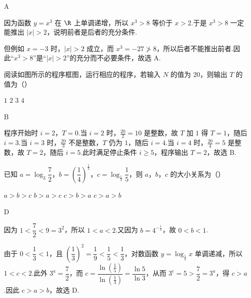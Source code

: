 \begin{answer}
A
\end{answer}

\begin{solution}
因为函数 \(y=x^3\) 在 \(\R\) 上单调递增，所以 \(x^3>8\) 等价于 \(x>2\).于是 \(x^3>8\) 一定能推出 \(|x|>2\)，说明前者是后者的充分条件.

但例如 \(x=-3\) 时，\(|x|>2\) 成立，而 \(x^3=-27\not>8\)，所以后者不能推出前者.因此“\(x^3>8\)”是“\(|x|>2\)”的充分而不必要条件，故选 A.
\end{solution}

\begin{problem}
阅读如图所示的程序框图，运行相应的程序，若输入 \(N\) 的值为 \(20\)，则输出 \(T\) 的值为（\quad）


\choices
    {\(1\)}
    {\(2\)}
    {\(3\)}
    {\(4\)}
\end{problem}

\begin{answer}
B
\end{answer}

\begin{solution}
程序开始时 \(i=2\)，\(T=0\).当 \(i=2\) 时，\(\frac{20}{2}=10\) 是整数，故 \(T\) 加 \(1\) 得 \(T=1\)，随后 \(i=3\).当 \(i=3\) 时，\(\frac{20}{3}\) 不是整数，\(T\) 仍为 \(1\)，随后 \(i=4\).当 \(i=4\) 时，\(\frac{20}{4}=5\) 是整数，故 \(T=2\)，随后 \(i=5\).此时满足停止条件 \(i\ge5\)，程序输出 \(T=2\)，故选 B.
\end{solution}

\begin{problem}
已知 \(a=\log_3\dfrac72\)，\(b=\left(\dfrac14\right)^{\frac13}\)，\(c=\log_{\frac13}\dfrac15\)，则 \(a\)，\(b\)，\(c\) 的大小关系为（\quad）

\choices
    {\(a>b>c\)}
    {\(b>a>c\)}
    {\(c>b>a\)}
    {\(c>a>b\)}
\end{problem}

\begin{answer}
D
\end{answer}

\begin{solution}
因为 \(1<\dfrac72<9=3^2\)，所以 \(1<a<2\).又因为 \(b=4^{-\frac{1}{3}}\)，故 \(0<b<1\).

由于 \(0<\dfrac13<1\)，且 \(\left(\dfrac13\right)^2=\dfrac19<\dfrac15<\dfrac13\)，对数函数 \(y=\log_{\frac13}x\) 单调递减，所以 \(1<c<2\).此外
\(3^a=\dfrac72\)，而
\(c=\dfrac{\ln(\frac{1}{5})}{\ln(\frac{1}{3})}=\dfrac{\ln5}{\ln3}\)，从而 \(3^c=5>\dfrac72=3^a\)，得 \(c>a\).因此 \(c>a>b\)，故选 D.
\end{solution}

